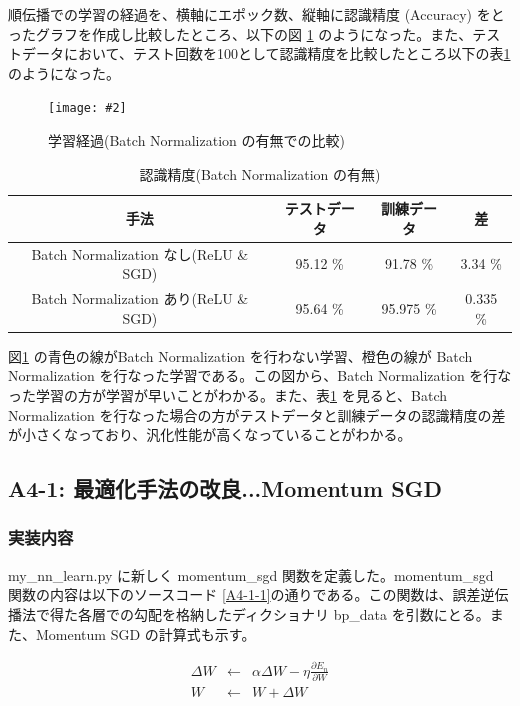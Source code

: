 \documentclass[a4paper,dvipdfmx]{jsarticle}
\newcommand{\image}[3]{
    \begin{figure}[H]
        \begin{center}
        \texttt{[image: \#2]}
        \end{center}
        \caption{#1}
        \label{#3}
    \end{figure}
}
\begin{document}
 順伝播での学習の経過を、横軸にエポック数、縦軸に認識精度 (Accuracy) をとったグラフを作成し比較したところ、以下の図 \ref{fig-A-3-1} のようになった。また、テストデータにおいて、テスト回数を100として認識精度を比較したところ以下の表\ref{tableA3-1} のようになった。
 
 \image{学習経過(Batch Normalization の有無での比較)}{report_a3-1.png}{fig-A-3-1}
 
\begin{table}[H]
\begin{center}
\caption{認識精度(Batch Normalization の有無)}
  \begin{tabular}{|c|c|c|c|} \hline
    手法 & テストデータ & 訓練データ & 差 \\ \hline \hline
   Batch Normalization なし(ReLU \& SGD) & 95.12 \% & 91.78 \% & 3.34 \%\\ \hline
   Batch Normalization あり(ReLU \& SGD) & 95.64 \% & 95.975 \% & 0.335 \%\\ \hline
  \end{tabular}
	\label{tableA3-1}
\end{center}
\end{table}

図\ref{fig-A-3-1} の青色の線がBatch Normalization を行わない学習、橙色の線が Batch Normalization を行なった学習である。この図から、Batch Normalization を行なった学習の方が学習が早いことがわかる。また、表\ref{tableA3-1} を見ると、Batch Normalization を行なった場合の方がテストデータと訓練データの認識精度の差が小さくなっており、汎化性能が高くなっていることがわかる。

\subsection*{A4-1: 最適化手法の改良...Momentum SGD}

\subsubsection*{実装内容}
my\_nn\_learn.py に新しく momentum\_sgd 関数を定義した。momentum\_sgd 関数の内容は以下のソースコード \ref{A4-1-1}の通りである。この関数は、誤差逆伝播法で得た各層での勾配を格納したディクショナリ bp\_data を引数にとる。また、Momentum SGD の計算式も示す。

\begin{eqnarray}
\label{msgd1}
	\Delta W & \leftarrow & \alpha \Delta W - \eta \frac{\partial E_n}{\partial W}\\
\label{msgd2}
	W & \leftarrow & W + \Delta W
\end{eqnarray}
\end{document}
